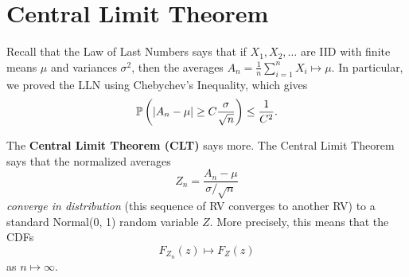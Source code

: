 \documentclass[letterpaper]{article}
\begin{document}
\section{Central Limit Theorem}
Recall that the Law of Last Numbers says that if $X_1, X_2, \dots$ are IID with finite means $\mu$ and variances $\sigma^2$, then the averages $A_n = \frac{1}{n} \sum_{i = 1}^{n} X_i \mapsto \mu$. In particular, we proved the LLN using Chebychev's Inequality, which gives 
\[\mathbb{P}\left(|A_n - \mu| \geq C \frac{\sigma}{\sqrt{n}}\right) \leq \frac{1}{C^2}.\] 

The \textbf{Central Limit Theorem (CLT)} says more. The Central Limit Theorem says that the normalized averages \[Z_n = \frac{A_n - \mu}{\sigma / \sqrt{n}}\] \emph{converge in distribution} (this sequence of RV converges to another RV) to a standard Normal(0, 1) random variable $Z$. More precisely, this means that the CDFs \[F_{Z_n}(z) \mapsto F_{Z}(z)\] as $n \mapsto \infty$. 
\end{document}
